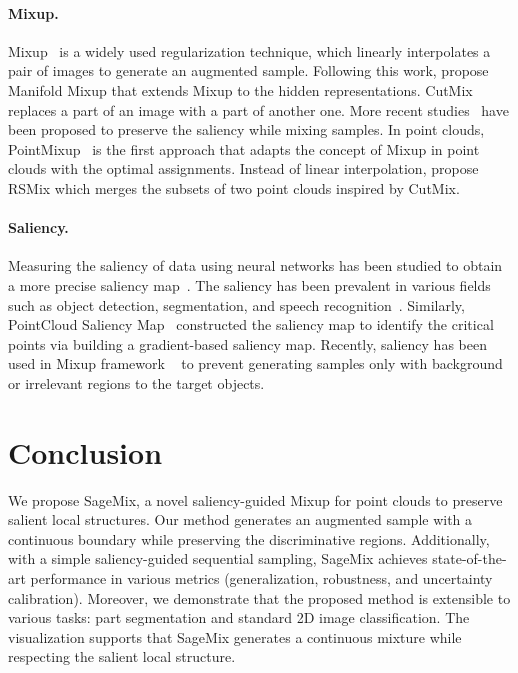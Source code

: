 \documentclass{article}
\begin{document}
\paragraph{Mixup.}
Mixup~\cite{DBLP:conf/iclr/ZhangCDL18} is a widely used regularization technique, which linearly interpolates a pair of images to generate an augmented sample. 
Following this work, \citet{verma2019manifold} propose Manifold Mixup that extends Mixup to the hidden representations. CutMix ~\cite{yun2019cutmix} replaces a part of an image with a part of another one. 
More recent studies~\cite{kim2020puzzle, DBLP:conf/iclr/KimCJS21, DBLP:conf/iclr/UddinMSCB21} have been proposed to preserve the saliency while mixing samples. 
In point clouds, PointMixup~\cite{chen2020pointmixup} is the first approach that adapts the concept of Mixup in point clouds with the optimal assignments. Instead of linear interpolation, \citet{lee2021regularization} propose RSMix which merges the subsets of two point clouds inspired by CutMix.

\paragraph{Saliency.}
Measuring the saliency of data using neural networks has been studied to obtain a more precise saliency map~\cite{selvaraju2017grad, wang2015deep, zhao2015saliency}. The saliency has been prevalent in various fields such as object detection, segmentation, and speech recognition~\cite{gong2021keepaugment, jung2011unified, kalinli2007saliency, ren2013region, wei2017object}. Similarly, PointCloud Saliency Map~\cite{zheng2019pointcloud} constructed the saliency map to identify the critical points via building a gradient-based saliency map. Recently, saliency has been used in Mixup framework ~\cite{kim2020puzzle, DBLP:conf/iclr/KimCJS21, DBLP:conf/iclr/UddinMSCB21} to prevent generating samples only with background or irrelevant regions to the target objects.
 \section{Conclusion}
\label{sec:con}
We propose SageMix, a novel saliency-guided Mixup for point clouds to preserve salient local structures. Our method generates an augmented sample with a continuous boundary while preserving the discriminative regions.
Additionally, with a simple saliency-guided sequential sampling, SageMix achieves state-of-the-art performance in various metrics (\eg generalization, robustness, and uncertainty calibration). Moreover, we demonstrate that the proposed method is extensible to various tasks: part segmentation and standard 2D image classification.
The visualization supports that SageMix generates a continuous mixture while respecting the salient local structure.
\end{document}
